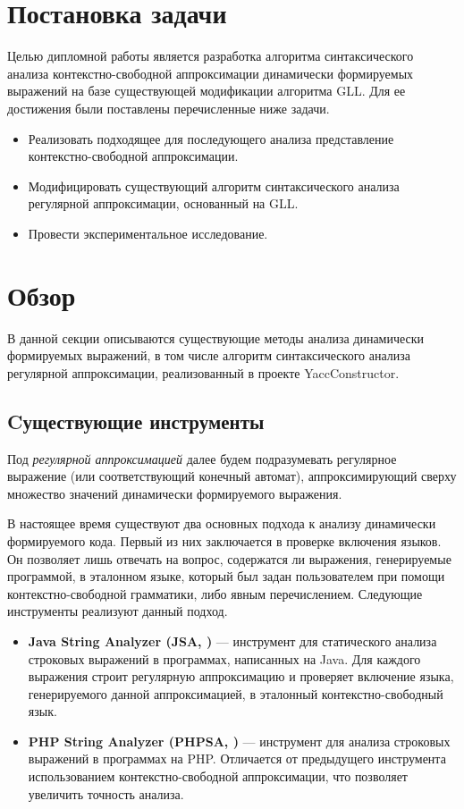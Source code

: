 \documentclass[14pt]{matmex-diploma-custom}
\begin{document}
\section{Постановка задачи}
Целью дипломной работы является разработка алгоритма синтаксического анализа контекстно-свободной аппроксимации динамически формируемых выражений на базе существующей модификации алгоритма GLL. Для ее достижения были поставлены перечисленные ниже задачи.
\begin{itemize}
    \item Реализовать подходящее для последующего анализа представление контекстно-свободной аппроксимации.
    \item Модифицировать существующий алгоритм синтаксического анализа регулярной аппроксимации, основанный на GLL.   
    \item Провести экспериментальное исследование.
\end{itemize}

\section{Обзор}
В данной секции описываются существующие методы анализа динамически формируемых выражений, в том числе алгоритм синтаксического анализа регулярной аппроксимации, реализованный в проекте YaccConstructor. 
\subsection{Cуществующие инструменты}
Под \textit{регулярной аппроксимацией} далее будем подразумевать регулярное выражение (или соответствующий конечный автомат), аппроксимирующий сверху множество значений динамически формируемого выражения.

В настоящее время существуют два основных подхода к анализу динамически формируемого кода. Первый из них заключается в проверке включения языков. Он позволяет лишь отвечать на вопрос, содержатся ли выражения, генерируемые программой, в эталонном языке, который был задан пользователем при помощи контекстно-свободной грамматики, либо явным перечислением. Следующие инструменты реализуют данный подход. 

\begin{itemize}
    \item \textbf{Java String Analyzer (JSA, \cite{jsa, jsa_url})} --- инструмент для статического анализа строковых выражений в программах, написанных на Java. Для каждого выражения строит регулярную аппроксимацию и проверяет включение языка, генерируемого данной аппроксимацией, в эталонный контекстно-свободный язык.
    \item \textbf{PHP String Analyzer (PHPSA, \cite{phpsa})} --- инструмент для анализа строковых выражений в программах на PHP. Отличается от предыдущего инструмента использованием контекстно-свободной аппроксимации, что позволяет увеличить точность анализа.
\end{itemize}
\end{document}
